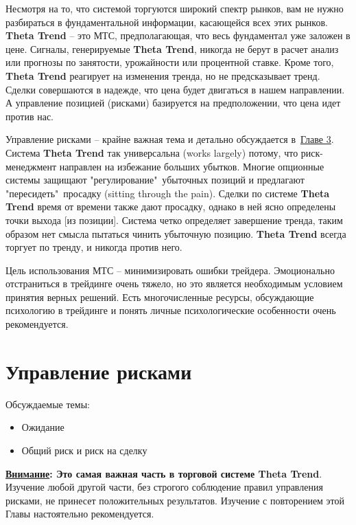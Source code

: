 \documentclass[12pt,DIV=18]{scrartcl}
\begin{document}
\bigskip

Несмотря на то, что системой торгуются широкий спектр рынков, вам не нужно разбираться в фундаментальной информации, касающейся всех этих рынков. \textbf{Theta Trend} -- это МТС, предполагающая, что весь фундаментал уже заложен в цене. Сигналы, генерируемые \textbf{Theta Trend}, никогда не берут в расчет анализ или прогнозы по занятости, урожайности или процентной ставке. Кроме того, \textbf{Theta Trend} реагирует на изменения тренда, но не предсказывает тренд. Сделки совершаются в надежде, что цена будет двигаться в нашем направлении. А управление позицией (рисками) базируется на предположении, что цена идет против нас.

\bigskip

Управление рисками -- крайне важная тема и детально обсуждается в~\hyperref[chapter3]{\ul{Главе 3}}. Система \textbf{Theta Trend} так универсальна (works  largely) потому, что риск-менеджмент направлен на избежание больших убытков. Многие опционные системы защищают "регулирование"\ убыточных позиций и предлагают "пересидеть"\ просадку (sitting through the pain). Сделки по системе \textbf{Theta Trend} время от времени также дают просадку, однако в ней ясно определены точки выхода [из позиции]. Система четко определяет завершение тренда, таким образом нет смысла пытаться чинить убыточную позицию. \textbf{Theta Trend} всегда торгует по тренду, и никогда против него.

\bigskip

Цель использования МТС -- минимизировать ошибки трейдера. Эмоционально отстраниться в трейдинге очень тяжело, но это является необходимым условием принятия верных решений. Есть многочисленные ресурсы, обсуждающие психологию в трейдинге и понять личные психологические особенности очень рекомендуется.

\section{Управление рисками}
\label{chapter3}

\bigskip

Обсуждаемые темы:

\begin{itemize}
\item Ожидание
\item Общий риск и риск на сделку
\end{itemize}

\bigskip

\textbf{\ul{Внимание}: Это самая важная часть в торговой системе Theta Trend}. Изучение любой другой части, без строгого соблюдение правил управления рисками, не принесет положительных результатов. Изучение с повторением этой Главы настоятельно рекомендуется.
 
\end{document}
